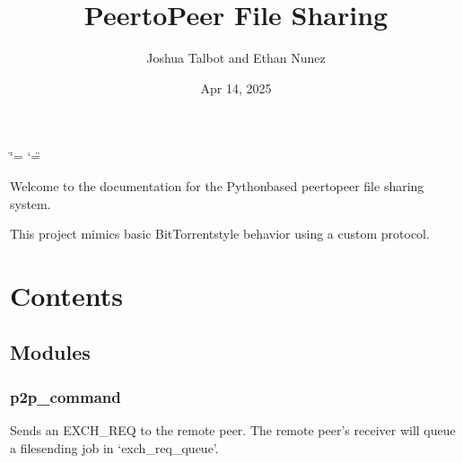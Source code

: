 \documentclass[letterpaper,10pt,oneside,english,openany]{sphinxmanual}
\title{Peer\sphinxhyphen{}to\sphinxhyphen{}Peer File Sharing}
\date{Apr 14, 2025}
\author{Joshua Talbot and Ethan Nunez}
\begin{document}
\ifdefined\shorthandoff
  \ifnum\catcode`\=\string=\active\shorthandoff{=}\fi
  \ifnum\catcode`\"=\active{}\fi
\fi

\pagestyle{empty}
\sphinxmaketitle
\pagestyle{plain}
\sphinxtableofcontents
\pagestyle{normal}
\label{\detokenize{index::doc}}


\sphinxAtStartPar
Welcome to the documentation for the Python\sphinxhyphen{}based peer\sphinxhyphen{}to\sphinxhyphen{}peer file sharing system.

\sphinxAtStartPar
This project mimics basic BitTorrent\sphinxhyphen{}style behavior using a custom protocol.


\chapter{Contents}
\label{\detokenize{index:contents}}
\sphinxstepscope


\section{Modules}
\label{\detokenize{modules:modules}}\label{\detokenize{modules::doc}}

\subsection{p2p\_command}
\label{\detokenize{modules:module-p2p_command}}\label{\detokenize{modules:p2p-command}}

\begin{fulllineitems}
\label{\detokenize{modules:p2p_command.exchange_data}}
\pysigstartsignatures
\pysiglinewithargsret
{}
{\sphinxparamcomma {}\sphinxparamcomma {}\sphinxparamcomma {}\sphinxparamcomma {}}
{}
\pysigstopsignatures
\sphinxAtStartPar
Sends an EXCH\_REQ to the remote peer.
The remote peer’s receiver will queue a file\sphinxhyphen{}sending job in ‘exch\_req\_queue’.

\end{fulllineitems}
\end{document}
